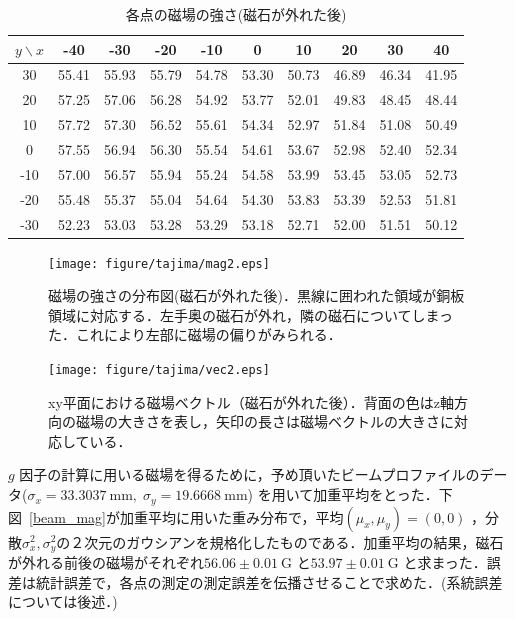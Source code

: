 \begin{table}[H]
\centering
\caption{各点の磁場の強さ(磁石が外れた後)}\label{MF2}
\begin{tabular}{|c||c|c|c|c|c|c|c|c|c|}\hline
$y \backslash x$ & -40 & -30 & -20 & -10 & 0 & 10 & 20 & 30 & 40 \\ \hline \hline
30 & 55.41 & 55.93 & 55.79 & 54.78 & 53.30 & 50.73 & 46.89 & 46.34 & 41.95 \\ \hline
20 & 57.25 & 57.06 & 56.28 & 54.92 & 53.77 & 52.01 & 49.83 & 48.45 & 48.44 \\ \hline
10 & 57.72 & 57.30 & 56.52 & 55.61 & 54.34 & 52.97 & 51.84 & 51.08 & 50.49 \\ \hline
0 & 57.55 & 56.94 & 56.30 & 55.54 & 54.61 & 53.67 & 52.98 & 52.40 & 52.34 \\ \hline
-10 & 57.00 & 56.57 & 55.94 & 55.24 & 54.58 & 53.99 & 53.45 & 53.05 & 52.73 \\ \hline
-20 & 55.48 & 55.37 & 55.04 & 54.64 & 54.30 & 53.83 & 53.39 & 52.53 & 51.81 \\ \hline
-30 & 52.23 & 53.03 & 53.28 & 53.29 & 53.18 & 52.71 & 52.00 & 51.51 & 50.12 \\ \hline
\end{tabular}
\end{table}
\begin{figure}[H]
\centering
\begin{minipage}{0.45\hsize}
\centering
\texttt{[image: figure/tajima/mag2.eps]}
\caption{磁場の強さの分布図(磁石が外れた後)．黒線に囲われた領域が銅板領域に対応する．左手奥の磁石が外れ，隣の磁石についてしまった．これにより左部に磁場の偏りがみられる．}
\label{mag2}
\end{minipage}
\begin{minipage}{0.45\hsize}
\centering
\texttt{[image: figure/tajima/vec2.eps]}
\caption{xy平面における磁場ベクトル（磁石が外れた後）．背面の色はz軸方向の磁場の大きさを表し，矢印の長さは磁場ベクトルの大きさに対応している．}
\label{vec2}
\end{minipage}
\end{figure}

$g$ 因子の計算に用いる磁場を得るために，予め頂いたビームプロファイルのデータ($\sigma_x = 33.3037~\mathrm{mm}, \; \sigma_y = 19.6668~\mathrm{mm}$) を用いて加重平均をとった．下図~\ref{beam_mag}が加重平均に用いた重み分布で，平均$(\mu_x,\mu_y)=(0,0)$ ，分散$\sigma_x^2, \sigma_y^2$の２次元のガウシアンを規格化したものである．加重平均の結果，磁石が外れる前後の磁場がそれぞれ$56.06 \pm 0.01~\mathrm{G}$ と$53.97\pm 0.01~\mathrm{G}$ と求まった．誤差は統計誤差で，各点の測定の測定誤差を伝播させることで求めた．(系統誤差については後述．)


